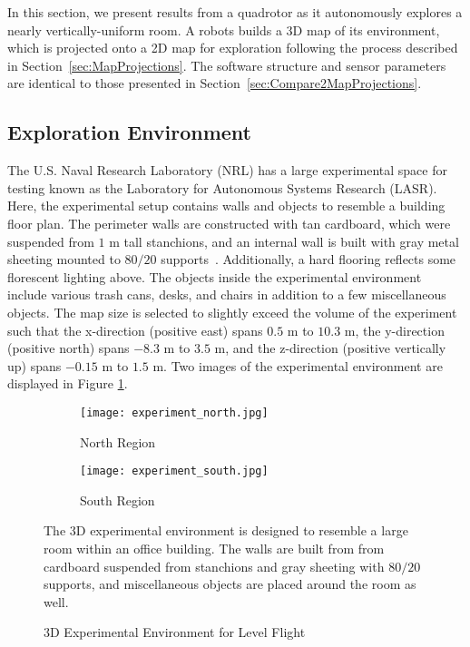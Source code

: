 In this section, we present results from a quadrotor as it autonomously explores a nearly vertically-uniform room. A robots builds a 3D map of its environment, which is projected onto a 2D map for exploration following the process described in Section~\ref{sec:MapProjections}. The software structure and sensor parameters are identical to those presented in Section~\ref{sec:Compare2MapProjections}.

\subsection{Exploration Environment}

The U.S. Naval Research Laboratory (NRL) has a large experimental space for testing known as the Laboratory for Autonomous Systems Research (LASR). Here, the experimental setup contains walls and objects to resemble a building floor plan. The perimeter walls are constructed with tan cardboard, which were suspended from $1$ m tall stanchions, and an internal wall is built with gray metal sheeting mounted to $80/20$ supports~\cite{url_8020}. Additionally, a hard flooring reflects some florescent lighting above. The objects inside the experimental environment include various trash cans, desks, and chairs in addition to a few miscellaneous objects. The map size is selected to slightly exceed the volume of the experiment such that the x-direction (positive east) spans $0.5$ m to $10.3$ m, the y-direction (positive north) spans $-8.3$ m to $3.5$ m, and the z-direction (positive vertically up) spans $-0.15$ m to $1.5$ m. Two images of the experimental environment are displayed in Figure \ref{fig:exp3DEnvironment}.

\begin{figure}[!t]
\centering
    	\begin{subfigure}[t]{0.95\columnwidth}
           	\centering
          	\texttt{[image: experiment\_north.jpg]}
        		\caption{North Region}
    	\end{subfigure}
    	\begin{subfigure}[t]{0.95\columnwidth}
	\vspace*{0.03\columnwidth}
           	\centering
          	\texttt{[image: experiment\_south.jpg]}
        		\caption{South Region}
    	\end{subfigure}
	\caption{3D Experimental Environment for Level Flight}
	\medskip
	\small
	The 3D experimental environment is designed to resemble a large room within an office building. The walls are built from from cardboard suspended from stanchions and gray sheeting with $80/20$ supports, and miscellaneous objects are placed around the room as well.
	\label{fig:exp3DEnvironment}
\end{figure}


